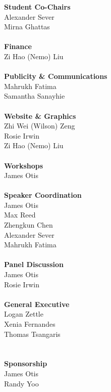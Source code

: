 \documentclass[titlepage,oneside,openany,10pt]{book}
\begin{document}
\begin{multicols}{2}
    \fontsize{12pt}{12pt}\selectfont
    \noindent\textbf{Student Co-Chairs}\\
    Alexander Sever\\
    Mirna Ghattas\\
    \\
    \noindent\textbf{Finance}\\
    Zi Hao (Nemo) Liu\\
    \\
    \noindent\textbf{Publicity \& Communications}\\
    Mahrukh Fatima\\
    Samantha Sanayhie\\
    \\
    \noindent\textbf{Website \& Graphics}\\
    Zhi Wei (Wilson) Zeng\\                          		
    Rosie Irwin\\							        
    Zi Hao (Nemo) Liu\\
    \\
    \noindent\textbf{Workshops}\\
    James Otis\\
    \\
    \noindent\textbf{Speaker Coordination}\\
    James Otis\\
    Max Reed\\
    Zhengkun Chen\\
    Alexander Sever\\
    Mahrukh Fatima\\
    \\
    \noindent\textbf{Panel Discussion}\\
    James Otis\\
    Rosie Irwin\\
    \\
    \noindent\textbf{General Executive}\\
    Logan Zettle\\
    Xenia Fernandes\\
    Thomas Tsangaris\\
    \\\\
    \noindent\textbf{Sponsorship}\\
    James Otis\\
    Randy Yoo\\

\end{multicols}
\end{document}
